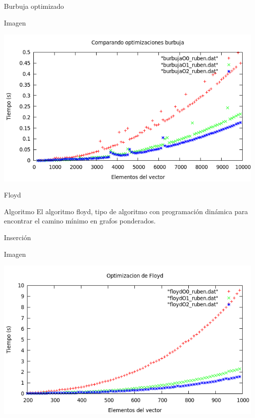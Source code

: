 \documentclass[compress]{beamer}
\begin{document}
\begin{frame}{Burbuja optimizado}
	\begin{alertblock}{Imagen}
	\begin{center}
	\includegraphics[scale=0.45]{../Graficas/Burbuja/burbuja_optimizacion.png}
	\end{center}
	\end{alertblock}
\end{frame}

\begin{frame}{Floyd}
	\begin{block}{Algoritmo}
	El algoritmo floyd, tipo de algoritmo con programación dinámica para encontrar el 			camino mínimo en grafos ponderados.
	\end{block}
\end{frame}

\begin{frame}{Inserción}
	\begin{alertblock}{Imagen}
	\begin{center}
	\includegraphics[scale=0.45]{../Graficas/Floyd/floyd_optimizacion.png}
	\end{center}
	\end{alertblock}
\end{frame}



\end{document}
